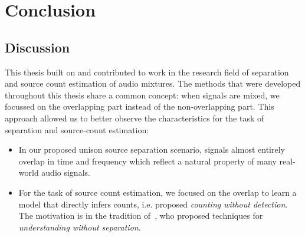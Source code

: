 \chapter{Conclusion}%
\label{cha:conclusion}


\section{Discussion}
This thesis built on and contributed to work in the research field of separation and source count estimation of audio mixtures. The methods that were developed throughout this thesis share a common concept: when signals are mixed, we focussed on the overlapping part instead of the non-overlapping part.
This approach allowed us to better observe the characteristics for the task of separation and source-count estimation:

\begin{itemize}
  \item In our proposed unison source separation scenario, signals almost entirely overlap in time and frequency which reflect a natural property of many real-world audio signals.
  \item For the task of source count estimation, we focused on the overlap to learn a model that directly infers counts, i.e. proposed \emph{counting without detection}. The motivation is in the tradition of~\cite{scheirer99}, who proposed techniques for \emph{understanding without separation}.
\end{itemize}

